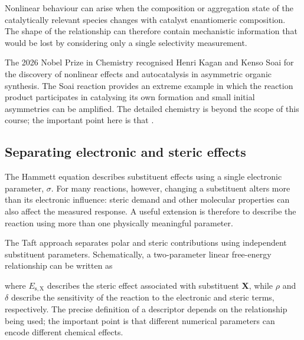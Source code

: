   Nonlinear behaviour can arise when the composition or aggregation state of the catalytically relevant species changes with catalyst enantiomeric composition.
  The shape of the relationship can therefore contain mechanistic information that would be lost by considering only a single selectivity measurement.

  The 2026 Nobel Prize in Chemistry recognised Henri Kagan and Kenso Soai for the discovery of nonlinear effects and autocatalysis in asymmetric organic synthesis.
  The Soai reaction provides an extreme example in which the reaction product participates in catalysing its own formation and small initial asymmetries can be amplified.
  The detailed chemistry is beyond the scope of this course; the important point here is that .

  \subsection{Separating electronic and steric effects}

The Hammett equation describes substituent effects using a single electronic parameter, $\sigma$.
For many reactions, however, changing a substituent alters more than its electronic influence: steric demand and other molecular properties can also affect the measured response.
A useful extension is therefore to describe the reaction using more than one physically meaningful parameter.

The Taft approach separates polar and steric contributions using independent substituent parameters.
Schematically, a two-parameter linear free-energy relationship can be written as


where $E_{\mathrm{s},\mathrm{X}}$ describes the steric effect associated with substituent \textbf{X}, while $\rho$ and $\delta$ describe the sensitivity of the reaction to the electronic and steric terms, respectively.
The precise definition of a descriptor depends on the relationship being used; the important point is that different numerical parameters can encode different chemical effects.

